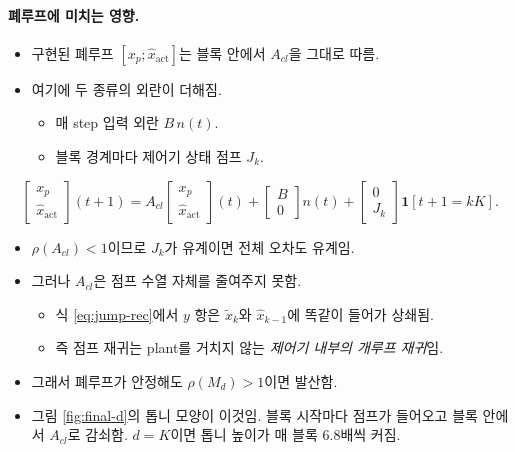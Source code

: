 \documentclass[11pt,a4paper]{article}
\begin{document}
\paragraph{폐루프에 미치는 영향.}
\begin{itemize}
\item 구현된 폐루프 $[x_p;\hat x_{\mathrm{act}}]$는 블록 안에서 $A_{cl}$을 그대로 따름.
\item 여기에 두 종류의 외란이 더해짐.
  \begin{itemize}
  \item 매 step 입력 외란 $B\,n(t)$.
  \item 블록 경계마다 제어기 상태 점프 $J_k$.
  \end{itemize}
\end{itemize}
\begin{equation}
\begin{bmatrix}x_p\\ \hat x_{\mathrm{act}}\end{bmatrix}(t+1)=A_{cl}\begin{bmatrix}x_p\\ \hat x_{\mathrm{act}}\end{bmatrix}(t)+\begin{bmatrix}B\\0\end{bmatrix}n(t)+\begin{bmatrix}0\\ J_k\end{bmatrix}\mathbf 1[t+1=kK].
\end{equation}
\begin{itemize}
\item $\rho(A_{cl})<1$이므로 $J_k$가 유계이면 전체 오차도 유계임.
\item 그러나 $A_{cl}$은 점프 수열 자체를 줄여주지 못함.
  \begin{itemize}
  \item 식 \eqref{eq:jump-rec}에서 $y$ 항은 $\tilde x_k$와 $\hat x_{k-1}$에 똑같이 들어가 상쇄됨.
  \item 즉 점프 재귀는 plant를 거치지 않는 \emph{제어기 내부의 개루프 재귀}임.
  \end{itemize}
\item 그래서 폐루프가 안정해도 $\rho(M_d)>1$이면 발산함.
\item 그림 \ref{fig:final-d}의 톱니 모양이 이것임. 블록 시작마다 점프가 들어오고 블록 안에서 $A_{cl}$로 감쇠함. $d=K$이면 톱니 높이가 매 블록 6.8배씩 커짐.
\end{itemize}
\end{document}
